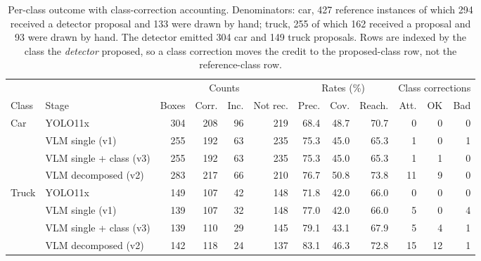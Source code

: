 \begin{table}[t]
\centering
\caption{Per-class outcome with class-correction accounting. Denominators:
car, 427 reference instances of which 294 received a detector proposal and 133
were drawn by hand; truck, 255 of which 162 received a proposal and 93 were
drawn by hand. The detector emitted 304 car and 149 truck proposals. Rows are
indexed by the class the \emph{detector} proposed, so a class correction moves
the credit to the proposed-class row, not the reference-class row.}
\label{tab:cartruck-full}
\scriptsize
\setlength{\tabcolsep}{3.5pt}
\begin{tabular}{llrrrrrrrrrr}
\toprule
 & & \multicolumn{4}{c}{Counts} & \multicolumn{3}{c}{Rates (\%)} & \multicolumn{3}{c}{Class corrections} \\
\cmidrule(lr){3-6}\cmidrule(lr){7-9}\cmidrule(lr){10-12}
Class & Stage & Boxes & Corr. & Inc. & Not rec. & Prec. & Cov. & Reach. & Att. & OK & Bad \\
\midrule
\multirow{4}{*}{Car}
 & YOLO11x                 & 304 & 208 & 96 & 219 & 68.4 & 48.7 & 70.7 &  0 & 0 & 0 \\
 & VLM single (v1)         & 255 & 192 & 63 & 235 & 75.3 & 45.0 & 65.3 &  1 & 0 & 1 \\
 & VLM single + class (v3) & 255 & 192 & 63 & 235 & 75.3 & 45.0 & 65.3 &  1 & 1 & 0 \\
 & VLM decomposed (v2)     & 283 & 217 & 66 & 210 & 76.7 & 50.8 & 73.8 & 11 & 9 & 0 \\
\midrule
\multirow{4}{*}{Truck}
 & YOLO11x                 & 149 & 107 & 42 & 148 & 71.8 & 42.0 & 66.0 &  0 & 0 & 0 \\
 & VLM single (v1)         & 139 & 107 & 32 & 148 & 77.0 & 42.0 & 66.0 &  5 & 0 & 4 \\
 & VLM single + class (v3) & 139 & 110 & 29 & 145 & 79.1 & 43.1 & 67.9 &  5 & 4 & 1 \\
 & VLM decomposed (v2)     & 142 & 118 & 24 & 137 & 83.1 & 46.3 & 72.8 & 15 &12 & 1 \\
\bottomrule
\end{tabular}
\end{table}


